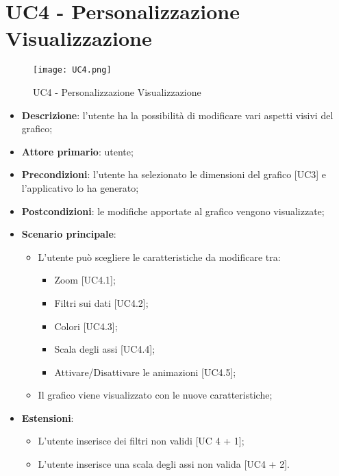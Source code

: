 \section{UC4 - Personalizzazione Visualizzazione}

\begin{figure}[h]
  \centering
  \texttt{[image: UC4.png]}
  \caption{UC4 - Personalizzazione Visualizzazione}
\end{figure}

\begin{itemize}
  \item \textbf{Descrizione}: l'utente ha la possibilità di modificare vari aspetti visivi del grafico;
  \item \textbf{Attore primario}: utente;
  \item \textbf{Precondizioni}: l'utente ha selezionato le dimensioni del grafico [UC3] e l'applicativo lo ha generato;
  \item \textbf{Postcondizioni}: le modifiche apportate al grafico vengono visualizzate;
  \item \textbf{Scenario principale}:
  \begin{itemize}
    \item L'utente può scegliere le caratteristiche da modificare tra:
      \begin{itemize}
        \item Zoom [UC4.1];
        \item Filtri sui dati [UC4.2];
        \item Colori [UC4.3];
        \item Scala degli assi [UC4.4];
        \item Attivare/Disattivare le animazioni [UC4.5];
      \end{itemize}
    \item Il grafico viene visualizzato con le nuove caratteristiche;
  \end{itemize}
  \item \textbf{Estensioni}:
    \begin{itemize}
      \item L'utente inserisce dei filtri non validi [UC 4 + 1];
      \item L'utente inserisce una scala degli assi non valida [UC4 + 2].
    \end{itemize}
\end{itemize}

